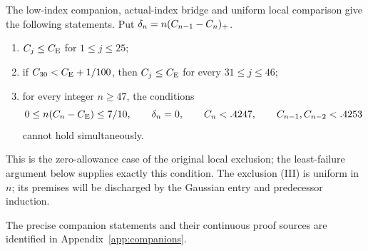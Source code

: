 \begin{proposition}\label{gi:inputs}
The low-index companion, actual-index bridge and uniform local comparison
give the following statements. Put
$\delta_n=n(C_{n-1}-C_n)_+$.
\begin{enumerate}
\item[(I)] $C_j\le C_{\mathrm E}$ for $1\le j\le25$;
\item[(II)] if $C_{30}<C_{\mathrm E}+1/100$, then $C_j\le C_{\mathrm E}$ for
every $31\le j\le46$;
\item[(III)] for every integer $n\ge47$, the conditions
\[
 0\le n(C_n-C_{\mathrm E})\le7/10,\qquad \delta_n=0,
 \qquad C_n<.4247,\qquad C_{n-1},C_{n-2}<.4253
\]
cannot hold simultaneously.
\end{enumerate}
This is the zero-allowance case of the original local exclusion;
the least-failure argument below supplies exactly this condition.
The exclusion (III) is uniform in $n$; its premises will be
discharged by the Gaussian entry and predecessor induction.
\end{proposition}
The precise companion statements and their continuous proof sources
are identified in Appendix~\ref{app:companions}.


